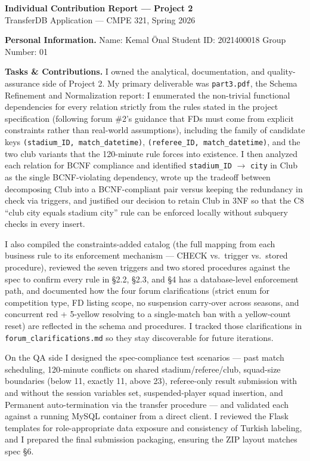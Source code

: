 \documentclass[12pt]{article}
\begin{document}
\begin{center}
\textbf{\large Individual Contribution Report --- Project 2}\\[4pt]
TransferDB Application --- CMPE 321, Spring 2026
\end{center}

\vspace{2pt}

\textbf{Personal Information.}
Name: Kemal \"{O}nal \quad Student ID: 2021400018 \quad Group Number: 01

\textbf{Tasks \& Contributions.}
I owned the analytical, documentation, and quality-assurance side of
Project 2. My primary deliverable was \texttt{part3.pdf}, the Schema
Refinement and Normalization report: I enumerated the non-trivial
functional dependencies for every relation strictly from the rules
stated in the project specification (following forum \#2's guidance
that FDs must come from explicit constraints rather than real-world
assumptions), including the family of candidate keys
\texttt{(stadium\_ID, match\_datetime)},
\texttt{(referee\_ID, match\_datetime)}, and the two club variants
that the 120-minute rule forces into existence. I then analyzed each
relation for BCNF compliance and identified
\texttt{stadium\_ID} $\to$ \texttt{city} in Club as the single
BCNF-violating dependency, wrote up the tradeoff between decomposing
Club into a BCNF-compliant pair versus keeping the redundancy in
check via triggers, and justified our decision to retain Club in 3NF
so that the C8 ``club city equals stadium city'' rule can be enforced
locally without subquery checks in every insert.

I also compiled the constraints-added catalog (the full mapping from
each business rule to its enforcement mechanism --- CHECK vs.\
trigger vs.\ stored procedure), reviewed the seven triggers and two
stored procedures against the spec to confirm every rule in \S2.2,
\S2.3, and \S4 has a database-level enforcement path, and documented
how the four forum clarifications (strict enum for competition type,
FD listing scope, no suspension carry-over across seasons, and
concurrent red + 5-yellow resolving to a single-match ban with a
yellow-count reset) are reflected in the schema and procedures. I
tracked those clarifications in \texttt{forum\_clarifications.md} so
they stay discoverable for future iterations.

On the QA side I designed the spec-compliance test scenarios --- past
match scheduling, 120-minute conflicts on shared stadium/referee/club,
squad-size boundaries (below 11, exactly 11, above 23), referee-only
result submission with and without the session variables set,
suspended-player squad insertion, and Permanent auto-termination via
the transfer procedure --- and validated each against a running MySQL
container from a direct client. I reviewed the Flask templates for
role-appropriate data exposure and consistency of Turkish labeling,
and I prepared the final submission packaging, ensuring the ZIP
layout matches spec \S6.
\end{document}
